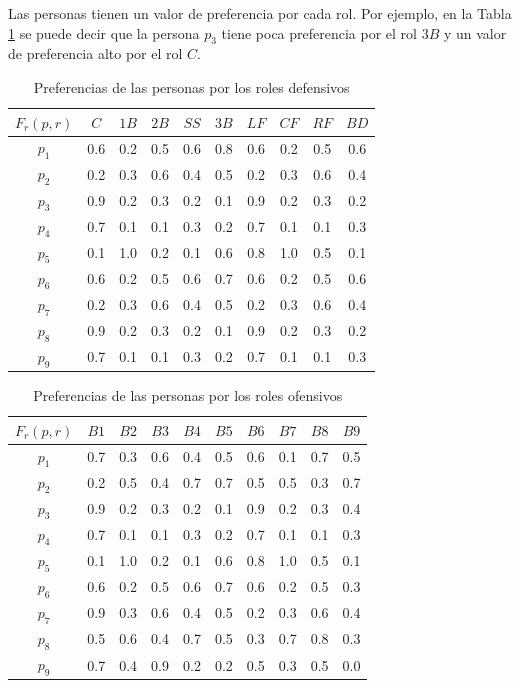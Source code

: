 Las personas tienen un valor de preferencia por cada rol. Por ejemplo, en la Tabla \ref{prd-pel} se puede decir que la persona $ p_3 $ tiene poca preferencia por el rol $ 3B $ y un valor de preferencia alto por el rol $ C $.
\begin{table}[H]
	\centering
	\caption{Preferencias de las personas por los roles defensivos}\label{prd-pel}
	\begin{tabular}{|c|c|c|c|c|c|c|c|c|c|}
		\hline
		$F_r(p,r)$ & $C$ & $1B$ & $2B$ & $SS$ & $3B$ & $LF$ & $CF$ & $RF$  & $BD$   \\ \hline
		$p_1$   & 0.6 & 0.2 & 0.5 & 0.6 & 0.8 & 0.6 & 0.2 & 0.5 & 0.6 \\ \hline
		$p_2$   & 0.2 & 0.3 & 0.6 & 0.4 & 0.5 & 0.2 & 0.3 & 0.6 & 0.4 \\ \hline
		$p_3$  	& 0.9 & 0.2 & 0.3 & 0.2 & 0.1 & 0.9 & 0.2 & 0.3 & 0.2 \\ \hline
		$p_4$ 	& 0.7 & 0.1 & 0.1 & 0.3 & 0.2 & 0.7 & 0.1 & 0.1 & 0.3 \\ \hline
		$p_5$   & 0.1 & 1.0 & 0.2 & 0.1 & 0.6 & 0.8 & 1.0 & 0.5 & 0.1 \\ \hline
		$p_6$   & 0.6 & 0.2 & 0.5 & 0.6 & 0.7 & 0.6 & 0.2 & 0.5 & 0.6 \\ \hline
		$p_7$   & 0.2 & 0.3 & 0.6 & 0.4 & 0.5 & 0.2 & 0.3 & 0.6 & 0.4 \\ \hline
		$p_8$  	& 0.9 & 0.2 & 0.3 & 0.2 & 0.1 & 0.9 & 0.2 & 0.3 & 0.2 \\ \hline
		$p_9$ 	& 0.7 & 0.1 & 0.1 & 0.3 & 0.2 & 0.7 & 0.1 & 0.1 & 0.3 \\ \hline
	\end{tabular}
\end{table}

\begin{table}[H]
	\centering
	\caption{Preferencias de las personas por los roles ofensivos}\label{pro-pel}
	\begin{tabular}{|c|c|c|c|c|c|c|c|c|c|}
		\hline
		$F_r(p,r)$ & $B1$& $B2$ & $B3$ & $B4$ & $B5$ & $B6$ & $B7$ & $B8$  & $B9$   \\ \hline
		$p_1$   & 0.7 & 0.3 & 0.6 & 0.4 & 0.5 & 0.6 & 0.1 & 0.7 & 0.5 \\ \hline
		$p_2$   & 0.2 & 0.5 & 0.4 & 0.7 & 0.7 & 0.5 & 0.5 & 0.3 & 0.7 \\ \hline
		$p_3$  	& 0.9 & 0.2 & 0.3 & 0.2 & 0.1 & 0.9 & 0.2 & 0.3 & 0.4 \\ \hline
		$p_4$ 	& 0.7 & 0.1 & 0.1 & 0.3 & 0.2 & 0.7 & 0.1 & 0.1 & 0.3 \\ \hline
		$p_5$   & 0.1 & 1.0 & 0.2 & 0.1 & 0.6 & 0.8 & 1.0 & 0.5 & 0.1 \\ \hline
		$p_6$   & 0.6 & 0.2 & 0.5 & 0.6 & 0.7 & 0.6 & 0.2 & 0.5 & 0.3 \\ \hline
		$p_7$   & 0.9 & 0.3 & 0.6 & 0.4 & 0.5 & 0.2 & 0.3 & 0.6 & 0.4 \\ \hline
		$p_8$  	& 0.5 & 0.6 & 0.4 & 0.7 & 0.5 & 0.3 & 0.7 & 0.8 & 0.3 \\ \hline
		$p_9$ 	& 0.7 & 0.4 & 0.9 & 0.2 & 0.2 & 0.5 & 0.3 & 0.5 & 0.0 \\ \hline
	\end{tabular}
\end{table}

